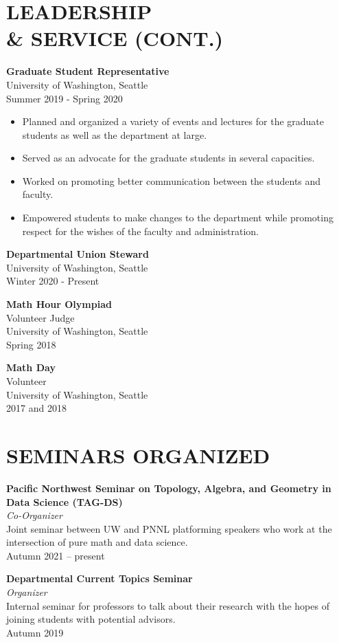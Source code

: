 \documentclass[margin]{res} %
\begin{document}
\begin{resume}
\section{LEADERSHIP\\ \& SERVICE (CONT.)}
{\bf Graduate Student Representative}\\
University of Washington, Seattle\\
Summer 2019 - Spring 2020
\begin{itemize} \itemsep -1pt
	\item Planned and organized a variety of events and lectures for the graduate students as well as the department at large.
    \item Served as an advocate for the graduate students in several capacities. 
	\item Worked on promoting better communication between the students and faculty.
	\item Empowered students to make changes to the department while promoting respect for the wishes of the faculty and administration.
\end{itemize}

\textbf{Departmental Union Steward}\\
University of Washington, Seattle\\
Winter 2020 - Present

{\bf Math Hour Olympiad}\\
Volunteer Judge \\
University of Washington, Seattle\\
Spring 2018

{\bf Math Day}\\
Volunteer\\
University of Washington, Seattle\\
2017 and 2018

\section{SEMINARS ORGANIZED}
\textbf{Pacific Northwest Seminar on Topology, Algebra, and Geometry in Data Science (TAG-DS)}\\
\textit{Co-Organizer}\\
Joint seminar between UW and PNNL platforming speakers who work at the intersection of pure math and data science.\\
Autumn 2021 -- present

\textbf{Departmental Current Topics Seminar}\\
\textit{Organizer}\\
Internal seminar for professors to talk about their research with the hopes of joining students with potential advisors.\\
Autumn 2019



\end{resume}
\end{document}
